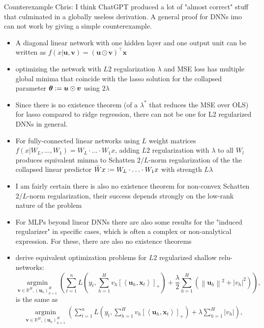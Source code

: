 \documentclass[11pt,compress,t,notes=noshow, xcolor=table]{beamer}
\begin{document}
\begin{vbframe}{Counterexample}
Chris: I think ChatGPT produced a lot of "almost correct" stuff that culminated in a globally useless derivation. A general proof for DNNs imo can not work by giving a simple counterexample.
\vspace{0.2cm}
\begin{itemize}
    \item A diagonal linear network with one hidden layer and one output unit can be written as $f(x|\bm{u},\bm{v}) = (\bm{u} \odot \bm{v})^{\top} \bm{x}$
    \item optimizing the network with $L2$ regularization $\lambda$ and MSE loss has multiple global minima that coincide with the lasso solution for the collapsed parameter $\thetav:=\bm{u}\odot \bm{v}$ using $2\lambda$
    \item Since there is no existence theorem (of a $\lambda^*$ that reduces the MSE over OLS) for lasso compared to ridge regression, there can not be one for L2 regularized DNNs in general.
    \item For fully-connected linear networks using $L$ weight matrices $f(x|W_L,\ldots,W_1)=W_L \cdot \ldots \cdot W_1 x$, adding $L2$ regularization with $\lambda$ to all $W_l$ produces equivalent minma to Schatten $2/L$-norm regularization of the the collapsed linear predictor $\Bar{W}x:=W_L \cdot \ldots \cdot W_1x$ with strength $L\lambda$
    \item I am fairly certain there is also no existence theorem for non-convex Schatten $2/L$-norm regularization, their success depends strongly on the low-rank nature of the problem
    \item For MLPs beyond linear DNNs there are also some results for the "induced regularizer" in specific cases, which is often a complex or non-analytical expression. For these, there are also no existence theorems
    \item {} derive equivalent optimization problems for $L2$ regularized shallow relu-networks:
    $$
\underset{\boldsymbol{v} \in \mathbb{R}^H,\left(\boldsymbol{u}_h\right)_{h=1}^H}{\operatorname{argmin}}\left(\sum_{t=1}^n L\left(y_t, \sum_{h=1}^H v_h\left[\left\langle\boldsymbol{u}_h, \boldsymbol{x}_t\right\rangle\right]_{+}\right)+\frac{\lambda}{2} \sum_{h=1}^H\left(\left\|\boldsymbol{u}_h\right\|^2+\left|v_h\right|^2\right)\right),
$$
is the same as
$$
\begin{gathered}
\underset{\boldsymbol{v} \in \mathbb{R}^H,\left(\boldsymbol{u}_h\right)_{h=1}^H}{\operatorname{argmin}}\left(\sum_{t=1}^n L\left(y_t, \sum_{h=1}^H v_h\left[\left\langle\boldsymbol{u}_h, \boldsymbol{x}_t\right\rangle\right]_{+}\right)+\lambda \sum_{h=1}^H\left|v_h\right|\right), \\

\end{gathered}$$
\end{itemize}
\end{vbframe}
\end{document}
